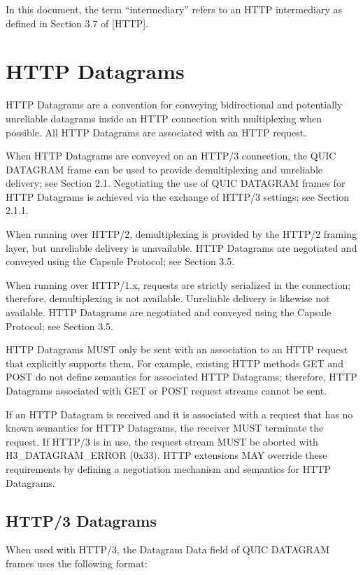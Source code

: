 \documentclass{article}
\begin{document}
In this document, the term ``intermediary'' refers to an HTTP
intermediary as defined in Section 3.7 of [HTTP].

\section{HTTP Datagrams}

HTTP Datagrams are a convention for conveying bidirectional and
potentially unreliable datagrams inside an HTTP connection with
multiplexing when possible.  All HTTP Datagrams are associated with
an HTTP request.

When HTTP Datagrams are conveyed on an HTTP/3 connection, the QUIC
DATAGRAM frame can be used to provide demultiplexing and unreliable
delivery; see Section 2.1.  Negotiating the use of QUIC DATAGRAM
frames for HTTP Datagrams is achieved via the exchange of HTTP/3
settings; see Section 2.1.1.

When running over HTTP/2, demultiplexing is provided by the HTTP/2
framing layer, but unreliable delivery is unavailable.  HTTP
Datagrams are negotiated and conveyed using the Capsule Protocol; see
Section 3.5.

When running over HTTP/1.x, requests are strictly serialized in the
connection; therefore, demultiplexing is not available.  Unreliable
delivery is likewise not available.  HTTP Datagrams are negotiated
and conveyed using the Capsule Protocol; see Section 3.5.

HTTP Datagrams MUST only be sent with an association to an HTTP
request that explicitly supports them.  For example, existing HTTP
methods GET and POST do not define semantics for associated HTTP
Datagrams; therefore, HTTP Datagrams associated with GET or POST
request streams cannot be sent.

If an HTTP Datagram is received and it is associated with a request
that has no known semantics for HTTP Datagrams, the receiver MUST
terminate the request.  If HTTP/3 is in use, the request stream MUST
be aborted with H3\_DATAGRAM\_ERROR (0x33).  HTTP extensions MAY
override these requirements by defining a negotiation mechanism and
semantics for HTTP Datagrams.

\subsection{HTTP/3 Datagrams}

When used with HTTP/3, the Datagram Data field of QUIC DATAGRAM
frames uses the following format:
\end{document}
